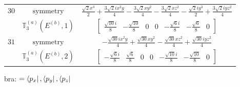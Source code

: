 \documentclass[fleqn,8pt,landscape]{jsarticle}
\begin{document}
\begin{longtable}{ccc}
$ 30 $ & $ \text{symmetry} $ & $ \frac{\sqrt{2} x^{3}}{2} + \frac{3 \sqrt{2} i x^{2} y}{4} - \frac{3 \sqrt{2} x y^{2}}{4} - \frac{3 \sqrt{2} x z^{2}}{4} - \frac{\sqrt{2} i y^{3}}{2} + \frac{3 \sqrt{2} i y z^{2}}{4} $ \\
$  $ & $ \mathbb{T}_{3}^{(a)}(E^{(b)},1) $ & $ \begin{bmatrix} \frac{\sqrt{10} i}{8} & - \frac{\sqrt{10}}{8} & 0 & 0 & - \frac{\sqrt{6} i}{8} & - \frac{\sqrt{6}}{8} & 0 \end{bmatrix} $ \\ \hline
$ 31 $ & $ \text{symmetry} $ & $ - \frac{\sqrt{30} i x^{2} y}{4} + \frac{\sqrt{30} x y^{2}}{4} - \frac{\sqrt{30} x z^{2}}{4} + \frac{\sqrt{30} i y z^{2}}{4} $ \\
$  $ & $ \mathbb{T}_{3}^{(a)}(E^{(b)},2) $ & $ \begin{bmatrix} - \frac{\sqrt{6} i}{8} & \frac{\sqrt{6}}{8} & 0 & 0 & - \frac{\sqrt{10} i}{8} & - \frac{\sqrt{10}}{8} & 0 \end{bmatrix} $ \\ \hline
\end{longtable}
bra: $=\bra{p_{x}}, \bra{p_{y}}, \bra{p_{z}}$
\end{document}

